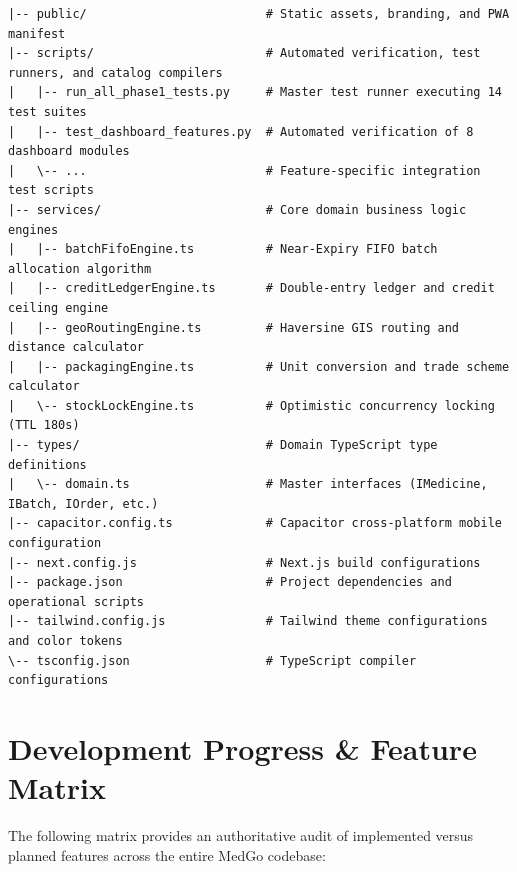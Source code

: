 \documentclass[10pt,a4paper]{article}
\begin{document}
\begin{verbatim}
|-- public/                         # Static assets, branding, and PWA manifest
|-- scripts/                        # Automated verification, test runners, and catalog compilers
|   |-- run_all_phase1_tests.py     # Master test runner executing 14 test suites
|   |-- test_dashboard_features.py  # Automated verification of 8 dashboard modules
|   \-- ...                         # Feature-specific integration test scripts
|-- services/                       # Core domain business logic engines
|   |-- batchFifoEngine.ts          # Near-Expiry FIFO batch allocation algorithm
|   |-- creditLedgerEngine.ts       # Double-entry ledger and credit ceiling engine
|   |-- geoRoutingEngine.ts         # Haversine GIS routing and distance calculator
|   |-- packagingEngine.ts          # Unit conversion and trade scheme calculator
|   \-- stockLockEngine.ts          # Optimistic concurrency locking (TTL 180s)
|-- types/                          # Domain TypeScript type definitions
|   \-- domain.ts                   # Master interfaces (IMedicine, IBatch, IOrder, etc.)
|-- capacitor.config.ts             # Capacitor cross-platform mobile configuration
|-- next.config.js                  # Next.js build configurations
|-- package.json                    # Project dependencies and operational scripts
|-- tailwind.config.js              # Tailwind theme configurations and color tokens
\-- tsconfig.json                   # TypeScript compiler configurations
\end{verbatim}

\section{Development Progress \& Feature Matrix}
The following matrix provides an authoritative audit of implemented versus planned features across the entire MedGo codebase:
\end{document}
